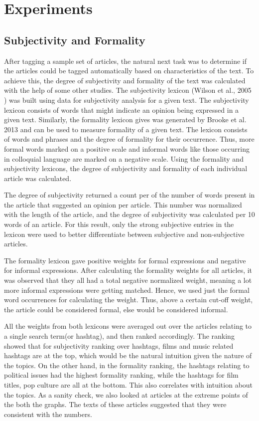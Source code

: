 \chapter {Experiments}

\section {Subjectivity and Formality }

After tagging a sample set of articles, the natural next task was to determine if the articles could be tagged automatically based on characteristics of the text. To achieve this, the degree of subjectivity and formality of the text was calculated with the help of some other studies. The subjectivity lexicon (Wilson et al., 2005 \cite{wilson2005recognizing}) was built using data for subjectivity analysis for a given text. The subjectivity lexicon consists of words that might indicate an opinion being expressed in a given text. Similarly, the formality lexicon gives was generated by Brooke et al. 2013 \cite{brooke2013multi} and can be used to measure formality of a given text. The lexicon consists of words and phrases and the degree of formality for their occurrence. Thus, more formal words marked on a positive scale and informal words like those occurring in colloquial language are marked on a negative scale. Using the formality and subjectivity lexicons, the degree of subjectivity and formality of each individual article was calculated. 

The degree of subjectivity returned a count per of the number of words present in the article that suggested an opinion per article. This number was normalized with the length of the article, and the degree of subjectivity was calculated per 10 words of an article. For this result, only the strong subjective entries in the lexicon were used to better differentiate between subjective and non-subjective articles.

The formality lexicon gave positive weights for formal expressions and negative for informal expressions. After calculating the formality weights for all articles, it was observed that they all had a total negative normalized weight, meaning a lot more informal expressions were getting matched. Hence, we used just the formal word occurrences for calculating the weight. Thus, above a certain cut-off weight, the article could be considered formal, else would be considered informal.

All the weights from both lexicons were averaged out over the articles relating to a single search term(or hashtag), and then ranked accordingly. The ranking showed that for subjectivity ranking over hashtags, films and music related hashtags are at the top, which would be the natural intuition given the nature of the topics. On the other hand, in the formality ranking, the hashtags relating to political issues had the highest formality ranking, while the hashtags for film titles, pop culture are all at the bottom. This also correlates with intuition about the topics. As a sanity check, we also looked at articles at the extreme points of the both the graphs. The texts of these articles suggested that they were consistent with the numbers.

